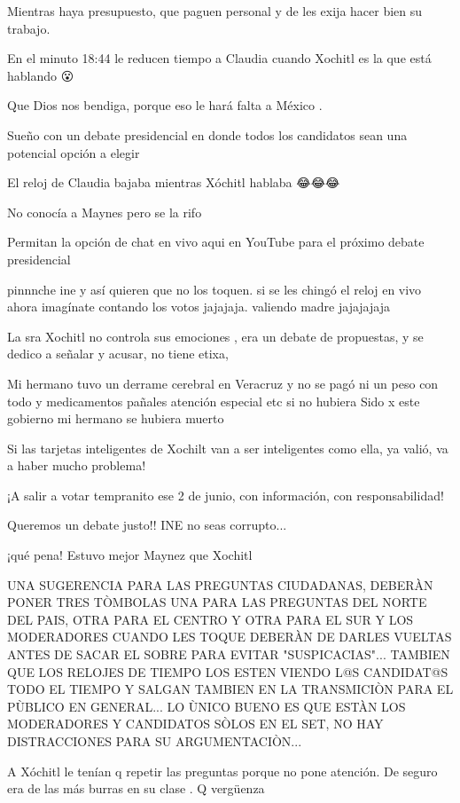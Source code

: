 Mientras haya presupuesto, que paguen personal y de les exija hacer bien su trabajo.

En el minuto 18:44 le reducen tiempo a Claudia cuando Xochitl es la que está hablando 😮

Que Dios nos bendiga, porque eso le hará falta a México .

Sueño con un debate presidencial en donde todos los candidatos sean una potencial opción a elegir

El reloj de Claudia bajaba mientras Xóchitl hablaba 😂😂😂

No conocía a Maynes pero se la rifo

Permitan la opción de chat en vivo aqui en YouTube para el próximo debate presidencial

pinnnche ine y así quieren que no los toquen. si se les chingó el reloj en vivo ahora imagínate contando los votos jajajaja. valiendo madre jajajajaja

La sra Xochitl no controla sus emociones , era un debate de propuestas, y se dedico a señalar y acusar, no tiene etixa,

Mi hermano tuvo un derrame cerebral  en Veracruz y no se pagó ni un peso  con todo y medicamentos pañales atención especial etc si no hubiera Sido x este gobierno mi hermano se hubiera muerto

Si las tarjetas inteligentes de Xochilt van a ser inteligentes como ella, ya valió, va a haber mucho problema!

¡A salir a votar tempranito ese 2 de junio, con información, con responsabilidad!

Queremos un debate justo!! INE no seas corrupto...

¡qué pena! Estuvo mejor Maynez que Xochitl

UNA  SUGERENCIA  PARA  LAS  PREGUNTAS  CIUDADANAS,  DEBERÀN  PONER  TRES  TÒMBOLAS  UNA  PARA  LAS PREGUNTAS    DEL  NORTE  DEL  PAIS,   OTRA  PARA  EL  CENTRO   Y   OTRA  PARA  EL  SUR      Y  LOS  MODERADORES CUANDO  LES  TOQUE   DEBERÀN  DE DARLES  VUELTAS  ANTES  DE SACAR  EL  SOBRE  PARA  EVITAR  "SUSPICACIAS"...  TAMBIEN  QUE  LOS  RELOJES  DE  TIEMPO  LOS  ESTEN  VIENDO  L@S  CANDIDAT@S  TODO  EL  TIEMPO  Y  SALGAN  TAMBIEN  EN  LA  TRANSMICIÒN  PARA EL  PÙBLICO  EN  GENERAL...  LO ÙNICO  BUENO  ES QUE  ESTÀN  LOS  MODERADORES Y  CANDIDATOS  SÒLOS  EN  EL  SET,  NO  HAY  DISTRACCIONES PARA  SU  ARGUMENTACIÒN...

A Xóchitl le tenían q repetir las preguntas porque no pone atención. De seguro era de las más burras en su clase . Q vergüenza

